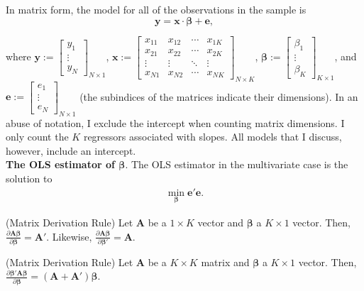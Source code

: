 \noindent In matrix form, the model for all of the observations in the sample is
\begin{equation}
	\bm{y} = \bm{x} \cdot \bm{\beta} + \bm{e},  	
\end{equation}

\noindent where $\bm{y} := {\begin{bmatrix} y_{1} \\ \vdots \\ y_{N} \end{bmatrix}}_{N \times 1}$, $\bm{x}:= {\begin{bmatrix} x_{11}  & x_{12} & \cdots  & x_{1K} \\ 
							  x_{21}  & x_{22} & \cdots  & x_{2K} \\
							  \vdots  & \vdots & \ddots  & \vdots \\ 
							  x_{N1}  & x_{N2} & \cdots  & x_{NK}							  \end{bmatrix}}_{N \times K}$, $\bm{\beta} := {\begin{bmatrix} \beta_{1} \\ \vdots \\ \beta_{K} \end{bmatrix}}_{K \times 1}$, and
							  $\bm{e} := {\begin{bmatrix} e_{1} \\ \vdots \\ e_{N} \end{bmatrix}}_{N \times 1}$ (the subindices of the matrices indicate their dimensions). In an abuse of notation, I exclude the intercept when counting matrix dimensions. I only count the $K$ regressors associated with slopes. All models that I discuss, however, include an intercept.\\

\noindent \textbf{The OLS estimator of $\bm{\beta}$}. The OLS estimator in the multivariate case is the solution to 
\begin{align} 
	\min_{\bm{\beta}} \bm{e}' \bm{e}	. \label{eq:problemtwomulti}
\end{align}

\begin{property} (Matrix Derivation Rule) Let $\bm{A}$ be a $1 \times K$ vector and $\bm{\beta}$ a $K \times 1$ vector. Then, $\frac{\partial \bm{A}\bm{\beta}}{\partial \bm{\beta}} = \bm{A}'$. Likewise,  $\frac{\partial \bm{A}\bm{\beta}}{\partial \bm{\beta}'} = \bm{A}$. 
\end{property}

\begin{property} (Matrix Derivation Rule) Let $\bm{A}$ be a $K \times K$ matrix and $\bm{\beta}$ a $K \times 1$ vector. Then, $\frac{\partial \bm{\beta}' \bm{A} \bm{\beta}}{\partial \bm{\beta}} = \left( \bm{A} + \bm{A}' \right) \bm{\beta}$. 
\end{property}

